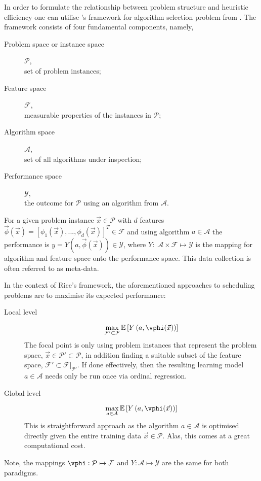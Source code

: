 In order to formulate the relationship between problem structure and heuristic efficiency one can utilise \citeauthor{Rice76}'s framework for algorithm selection problem from \citeyear{Rice76}. The framework consists of four fundamental components, namely,
\begin{description}
	\item[Problem space or instance space] $\mathcal{P}$, \hfill\\
	set of problem instances; 
	\item[Feature space] $\mathcal{F}$, \hfill\\
	measurable properties of the instances in $\mathcal{P}$;
	\item[Algorithm space] $\mathcal{A}$, \hfill\\
	set of all algorithms under inspection;
	\item[Performance space] $\mathcal{Y}$, \hfill\\
	the outcome for $\mathcal{P}$ using an algorithm from $\mathcal{A}$.
\end{description}
For a given problem instance $\vec{x}\in\mathcal{P}$ with $d$ features $\vec{\phi}(\vec{x})=\left[\phi_1(\vec{x}),...,\phi_d( \vec{x})\right]^T\in\mathcal{F}$ and using algorithm $a\in\mathcal{A}$ the performance is $y=Y(a,\vec{\phi}(\vec{x}))\in\mathcal{Y}$, where $Y:\;\mathcal{A}\times\mathcal{F} \mapsto \mathcal{Y}$ is the mapping for algorithm and feature space onto the performance space. This data collection is often referred to as meta-data. 

In the context of Rice's framework, the aforementioned approaches to scheduling problems are to maximise its expected performance: 

\begin{description}
	\item[Local level] 
	\begin{equation}
		\max_{\mathcal{F}'\subset\mathcal{F}} \mathbb{E}\left[Y\left(a,\vphi(\vec{x})\right)\right]
	\end{equation}
	The  focal point is only using  problem instances that represent the problem space, $\vec{x}\in\mathcal{P'}\subset\mathcal{P}$, in addition finding a suitable subset of the feature space, $\mathcal{F}'\subset\mathcal{F}|_{\mathcal{P}'}$. If done effectively, then the resulting learning model $a\in\mathcal{A}$ needs only be run once via ordinal regression.
	\item[Global level]
	\begin{equation}
		\max_{a\in\mathcal{A}} \mathbb{E}\left[Y\left(a,\vphi(\vec{x})\right)\right]
	\end{equation}
	This is  straightforward  approach as the algorithm $a\in\mathcal{A}$ is optimised directly given the entire training data $\vec{x}\in\mathcal{P}$. Alas, this comes at a great computational cost.
\end{description}
Note, the mappings $\vphi:\mathcal{P}\mapsto\mathcal{F}$ and $Y:\mathcal{A}\mapsto\mathcal{Y}$ are the same for both paradigms.


